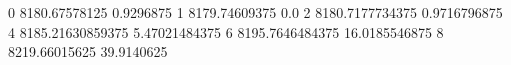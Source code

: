 0 8180.67578125 0.9296875
1 8179.74609375 0.0
2 8180.7177734375 0.9716796875
4 8185.21630859375 5.47021484375
6 8195.7646484375 16.0185546875
8 8219.66015625 39.9140625
